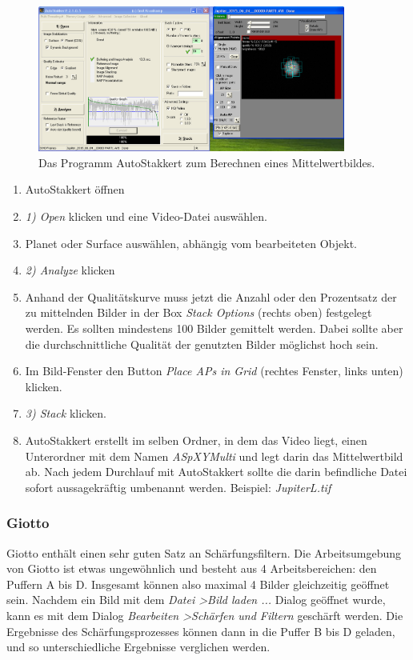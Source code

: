 \documentclass[10pt,a4paper,titlepage]{article}
\begin{document}
\begin{figure}[h!]
  \centering
    \includegraphics[width=0.9\textwidth]{AutoStakkert}
  \caption{Das Programm AutoStakkert zum Berechnen eines Mittelwertbildes.}
  \label{fig:autostakkert}
\end{figure}

\begin{enumerate}
\item AutoStakkert öffnen
\item \textit{1) Open} klicken und eine Video-Datei auswählen.
\item Planet oder Surface auswählen, abhängig vom bearbeiteten Objekt.
\item \textit{2) Analyze} klicken
\item Anhand der Qualitätskurve muss jetzt die Anzahl oder den Prozentsatz der zu mittelnden Bilder in der Box \textit{Stack Options} (rechts oben) festgelegt werden. Es sollten mindestens 100 Bilder gemittelt werden. Dabei sollte aber die durchschnittliche Qualität der genutzten Bilder möglichst hoch sein.
\item Im Bild-Fenster den Button \textit{Place APs in Grid} (rechtes Fenster, links unten) klicken.
\item \textit{3) Stack} klicken.
\item AutoStakkert erstellt im selben Ordner, in dem das Video liegt, einen Unterordner mit dem Namen \textit{AS\textunderscore pXY\textunderscore Multi} und legt darin das Mittelwertbild ab. Nach jedem Durchlauf mit AutoStakkert sollte die darin befindliche Datei sofort aussagekräftig umbenannt werden. Beispiel: \textit{ Jupiter\textunderscore L.tif}
\end{enumerate}

\subsubsection{Giotto}
Giotto enthält einen sehr guten Satz an Schärfungsfiltern. Die Arbeitsumgebung von Giotto ist etwas ungewöhnlich und besteht aus 4 Arbeitsbereichen: den Puffern A bis D. Insgesamt können also maximal 4 Bilder gleichzeitig geöffnet sein. Nachdem ein Bild mit dem \textit{Datei \textgreater Bild laden ...} Dialog geöffnet wurde, kann es mit dem Dialog \textit{Bearbeiten \textgreater Schärfen und Filtern} geschärft werden. Die Ergebnisse des Schärfungsprozesses können dann in die Puffer B bis D geladen, und so unterschiedliche Ergebnisse verglichen werden.
\end{document}
